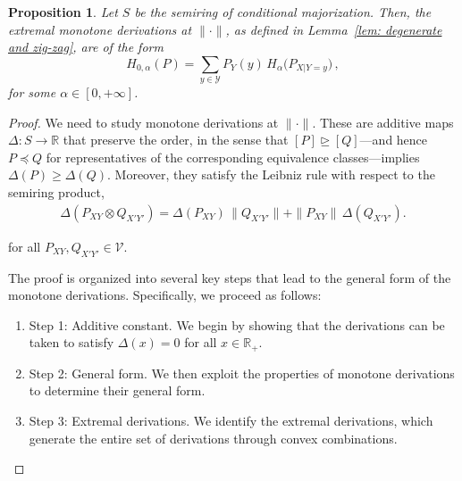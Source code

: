 \documentclass[aps,pra,11pt,onecolumn,nofootinbib,tightenlines]{revtex4-2}
\newtheorem{proposition}[theorem]{Proposition}
\theoremstyle{definition}
\newcommand{\V}{\mathcal{V}}
\newcommand{\rgeq}{\trianglerighteq}
\begin{document}
\begin{proposition}
\label{prop: monotone derivations}
Let \( S\) be the semiring of conditional majorization. Then, the extremal monotone derivations at \(\|\cdot\|\), as defined in Lemma~\ref{lem: degenerate and zig-zag}, are of the form
\begin{equation}
\label{eq:ExtDerivation}
H_{0,\alpha}(P)
= \sum_{y \in \mathcal{Y}} P_Y(y) \, H_\alpha\!\big(P_{X|Y = y}\big)\,,
\end{equation}
for some \(\alpha \in [0,+\infty]\).
\end{proposition}
\begin{proof}
We need to study monotone derivations at $\|\cdot\|$. These are additive maps \(\Delta \colon S \to \mathbb{R}\) that preserve the order, in the sense that \([P] \rgeq [Q]\)—and hence \(P \preceq Q\) for representatives of the corresponding equivalence classes—implies \(\Delta(P) \geq \Delta(Q)\). Moreover, they satisfy the Leibniz rule with respect to the semiring product,
\begin{align}\label{eq:LeibnizRule}
\Delta(P_{XY}\otimes Q_{X'Y'})
= \Delta(P_{XY})\,\|Q_{X'Y'}\|
+ \|P_{XY}\|\,\Delta(Q_{X'Y'}) .
\end{align}

for all $P_{XY},Q_{X'Y'}\in\V$.

The proof is organized into several key steps that lead to the general form of the monotone derivations. Specifically, we proceed as follows:
\begin{enumerate}
    \item Step 1: Additive constant. We begin by showing that the derivations can be taken to satisfy \(\Delta(x) = 0\) for all \(x \in \mathbb{R}_+\).
    \item Step 2: General form. We then exploit the properties of monotone derivations to determine their general form.
    \item Step 3: Extremal derivations. We identify the extremal derivations, which generate the entire set of derivations through convex combinations.
\end{enumerate}


\medskip


\end{proof}
\end{document}
